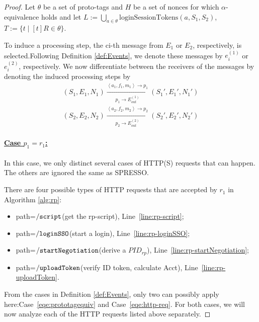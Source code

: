 \documentclass[letterpaper,onecolumn,10pt]{article}
\begin{document}
\begin{proof}
  Let $\theta$ be a set of proto-tags and $H$ be a set of 
  nonces for which $\alpha$-equivalence holds and let 
  $L:=\bigcup_{a\in\theta}\text{loginSessionTokens}(a,S_1,S_2)$,
  $T:=\{t\mid [t]R\in \theta\}$.
  
  To induce a processing step, the ci-th message from $E_1$ or 
  $E_2$, respectively, is selected.Following Definition 
  \ref{def:Events}, we denote these messages by $e_i^{(1)}$ or 
  $e_i^{(2)}$, respectively. We now differentiate between the 
  receivers of the messages by denoting the induced processing 
  steps by
  \begin{equation}
    \begin{aligned}
      (S_1,E_1,N_1)\xrightarrow[p_1\rightarrow E_{out}^{(1)}]{\left \langle a_1,f_1,m_1\right \rangle\rightarrow p_1}(S_1\prime,E_1\prime,N_1\prime)\\
      (S_2,E_2,N_2)\xrightarrow[p_2\rightarrow E_{out}^{(2)}]{\left \langle a_2,f_2,m_2\right \rangle\rightarrow p_2}(S_2\prime,E_2\prime,N_2\prime)
    \end{aligned}
  \end{equation}
  \paragraph{\underline{Case $p_1=r_1$:}}
  In this case, we only distinct several cases of HTTP(S) requests that can happen. The others are ignored the same as SPRESSO.\par
  There are four possible types of HTTP requests that are accepted by $r_1$ in Algorithm \ref{alg:rp}:
  \begin{itemize}
    \item path=$\mathtt{/script}$(get the rp-script), Line~\ref{line:rp-script};
    \item path=$\mathtt{/loginSSO}$(start a login), Line~\ref{line:rp-loginSSO};
    \item path=$\mathtt{/startNegotiation}$(derive a $PID_{rp}$), Line~\ref{line:rp-startNegotiation};
    \item path=$\mathtt{/uploadToken}$(verify ID token, calculate Acct), Line~\ref{line:rp-uploadToken}.
  \end{itemize}
  \par From the cases in Definition \ref{def:Events}, only two 
  can possibly apply here:Case~\ref{eqe:prototagequiv} and 
  Case~\ref{eqe:http-req}. For both cases, we will now analyze 
  each of the HTTP requests listed above separately.


\end{proof}
\end{document}
